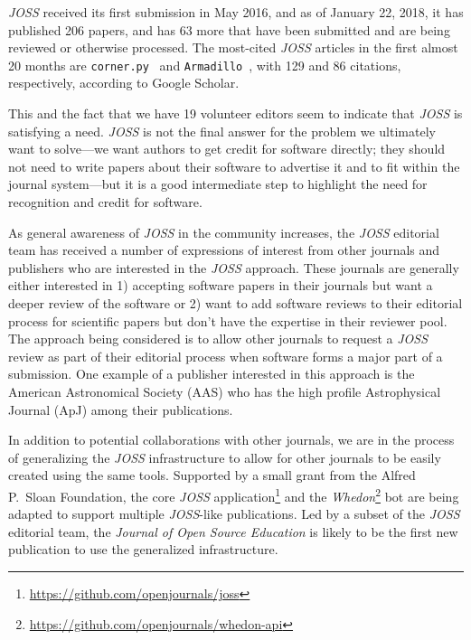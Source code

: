 \documentclass{article}
\newcommand\joss{\textit{JOSS}}
\begin{document}
\joss{} received its first submission in May 2016, and as of January 22, 2018, it has published 206 papers, and has 63 more that have been submitted and are being reviewed or otherwise processed.
The most-cited \joss{} articles in the first almost 20 months are \texttt{corner.py}~\cite{cornerpy} and \texttt{Armadillo}~\cite{armadillo}, with 129 and 86 citations, respectively, according to Google Scholar.

This and the fact that we have 19 volunteer editors seem to indicate that \joss{} is satisfying a need.  \joss{} is not the final answer for the problem we ultimately want to solve---we want authors to get credit for software directly; they should not need to write papers about their software to advertise it and to fit within the journal system---but it is a good intermediate step to highlight the need for recognition and credit for software.

As general awareness of \joss{} in the community increases, the \joss{} editorial team has received a number of expressions of interest from other journals and publishers who are interested in the \joss{} approach. These journals are generally either interested in 1) accepting software papers in their journals but want a deeper review of the software or 2) want to add software reviews to their editorial process for scientific papers but don't have the expertise in their reviewer pool. The approach being considered is to allow other journals to request a \joss{} review as part of their editorial process when software forms a major part of a submission. One example of a publisher interested in this approach is the American Astronomical Society (AAS) who has the high profile Astrophysical Journal (ApJ) among their publications.

In addition to potential collaborations with other journals, we are in the process of generalizing the \joss{} infrastructure to allow for other journals to be easily created using the same tools. Supported by a small grant from the Alfred P.\ Sloan Foundation, the core \joss{} application\footnote{\url{https://github.com/openjournals/joss}} and the \textit{Whedon}\footnote{\url{https://github.com/openjournals/whedon-api}} bot are being adapted to support multiple \joss{}-like publications. Led by a subset of the \joss{} editorial team, the \textit{Journal of Open Source Education} is likely to be the first new publication to use the generalized infrastructure.

\printbibliography
\end{document}
